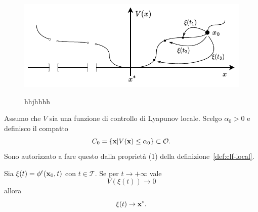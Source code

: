 \begin{steps}
    \begin{figure}[H]
        \centering
        \hfill
        \includegraphics[width=\textwidth]{assets/ljapunov-aff1}
        \label{fig:ljapunov-aff1}
        \caption[hhhh]{hhjhhhh}%
    \end{figure}






    \item Assumo che $V$ sia una funzione di controllo di Lyapunov locale.
    Scelgo $\alpha_0 > 0$ e definisco il compatto
    \begin{equation*}
        C_0 = \left\{\mathbf{x} | V(\mathbf{x}) \leq \alpha_0 \right\} \subset \mathcal O.
    \end{equation*}
    Sono autorizzato a fare questo dalla proprietà (1) della definizione~\ref{def:clf-local}.

    \begin{aff}
        Sia $\xi(t) = \phi^t(\mathbf{x}_0, t)$ con $t \in \mathcal T$.
        Se per $t \to +\infty$ vale
        \begin{equation*}
            V(\xi(t)) \to 0
        \end{equation*}
        allora
        \begin{equation*}
            \xi(t) \to \mathbf{x}^*.
        \end{equation*}
    \end{aff}


\end{steps}

